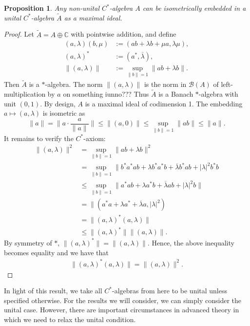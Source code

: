 \documentclass[12pt,a4paper]{amsart}
\theoremstyle{plain}
\newtheorem{prop}{Proposition}
\theoremstyle{definition}
\newcommand{\B}{\mathcal{B}}
\newcommand{\1}{\mathbbm{1}}
\newcommand{\C}{\mathbb{C}}
\begin{document}
\begin{prop}
	Any non-unital $C^\ast$-algebra $A$ can be isometrically embedded 
	in a unital $C^\ast$-algebra $\tilde{A}$ as a maximal ideal.
\end{prop}
\begin{proof}
	Let $\tilde{A} = A \oplus \C$ with pointwise addition, and define
	\begin{align*}
		(a,\lambda) (b,\mu) &:= (ab+\lambda b + \mu a, \lambda \mu),		\\
		(a,\lambda)^\ast &:= (a^\ast,\overline{\lambda}),					\\
		\|(a,\lambda)\| &:= \sup_{\|b\|=1}{\|ab+\lambda b\|}.
	\end{align*}
	Then $\tilde{A}$ is a $\ast$-algebra. The norm $\|(a,\lambda)\|$ is the norm 
	in $\B(A)$ of left-multiplication by $a$ on something iunno???
	Thus $\tilde{A}$ is a Banach $\ast$-algebra with unit $(0,1)$. 
	By design, $A$ is a maximal ideal of codimension 1. 
	The embedding $a\mapsto(a,\lambda)$ is isometric as 
	\[
		\|a\| = \|a\cdot\frac{a}{\|a\|}\| \leq \|(a,0)\| \leq \sup_{\|b\|=1}{\|ab\|} \leq \|a\|.
	\]
	It remains to verify the $C^\ast$-axiom:
	\begin{align*}
				\|(a,\lambda)\|^2 
		&=		\sup_{\|b\|=1}{\|ab+\lambda b\|^2}								\\
		&=		\sup_{\|b\|=1}{\|b^\ast a^\ast ab 
								+\lambda b^\ast a^\ast b
								+\overline{\lambda}b^\ast a b
								+|\lambda|^2 b^\ast b}							\\
		&\leq	\sup_{\|b\|=1}{\|a^\ast ab 
								+\lambda a^\ast b
								+\overline{\lambda}a b
								+|\lambda|^2 b\|}									\\
		&=		\|(a^\ast a + \lambda a^\ast +\overline{\lambda}a,|\lambda|^2)	\\
		&= 		\|(a,\lambda)^\ast(a,\lambda)\|									\\
		&\leq	\|(a,\lambda)^\ast\| \|(a,\lambda)\|.
	\end{align*}
	By symmetry of $\ast$, $\|(a,\lambda)^\ast\| = \|(a,\lambda)\|$. 
	Hence, the above inequality becomes equality and we have that
	\begin{align*}
		\|(a,\lambda)^\ast(a,\lambda)\| = \|(a,\lambda)\|^2. 
	\end{align*}		
	
\end{proof}

In light of this result, we take all $C^\ast$-algebras from here to be unital unless
specified otherwise.
For the results we will consider, we can simply consider the unital case. 
However, there are important circumstances in advanced theory in which we 
need to relax the unital condition.
\end{document}
